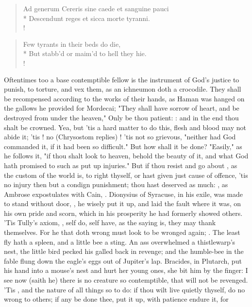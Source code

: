 {%
\begin{latin}%
\begin{verse}%
Ad generum Cereris sine caede et sanguine pauci\\*
Descendunt reges et sicca morte tyranni.\\!
\end{verse}%
\end{latin}%
\translationrule%
\begin{verse}%
Few tyrants in their beds do die,\\*
But stabb'd or maim'd to hell they hie.\\!
\end{verse}%


Oftentimes too a base contemptible fellow is the instrument of God's justice to punish, to torture, and vex them, as an ichneumon doth a crocodile. They shall be recompensed according to the works of their hands, as Haman was hanged on the gallows he provided for Mordecai; "They shall have sorrow of heart, and be destroyed from under the heaven,"  Only be thou patient: : and in the end thou shalt be crowned. Yea, but 'tis a hard matter to do this, flesh and blood may not abide it; 'tis ! no (Chrysostom replies) ! 'tis not so grievous, "neither had God commanded it, if it had been so difficult." But how shall it be done? "Easily," as he follows it, "if thou shalt look to heaven, behold the beauty of it, and what God hath promised to such as put up injuries." But if thou resist and go about , as the custom of the world is, to right thyself, or hast given just cause of offence, 'tis no injury then but a condign punishment; thou hast deserved as much: , as Ambrose expostulates with Cain, . Dionysius of Syracuse, in his exile, was made to stand without door, , he wisely put it up, and laid the fault where it was, on his own pride and scorn, which in his prosperity he had formerly showed others. 'Tis Tully's axiom, , self do, self have, as the saying is, they may thank themselves. For he that doth wrong must look to be wronged again; . The least fly hath a spleen, and a little bee a sting. An ass overwhelmed a thistlewarp's nest, the little bird pecked his galled back in revenge; and the humble-bee in the fable flung down the eagle's eggs out of Jupiter's lap. Bracides, in Plutarch, put his hand into a mouse's nest and hurt her young ones, she bit him by the finger: I see now (saith he) there is no creature so contemptible, that will not be revenged. 'Tis , and the nature of all things so to do: if thou wilt live quietly thyself, do no wrong to others; if any be done thee, put it up, with patience endure it, for }
